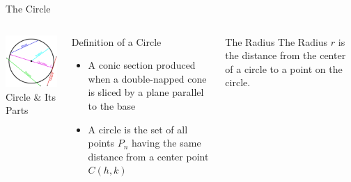 \documentclass[14pt,aspectratio=169]{beamer}
\begin{document}
\begin{frame}{The Circle}
 \begin{columns}
  \centering
  \includegraphics[width=1\textwidth]{image06}\\Circle \& Its Parts
    \begin{block}{Definition of a Circle}
      \begin{itemize}
       \item A conic section produced when a double-napped cone is sliced by a plane parallel to the base
       \item A circle is the set of all points $P_n$ having the same distance from a center point $C(h,k)$
      \end{itemize}
    \end{block}
      \begin{block}{The Radius}
      The Radius $r$ is the distance from the center of a circle to a point on the circle.

    \end{block}

 \end{columns}

\end{frame}
\end{document}
